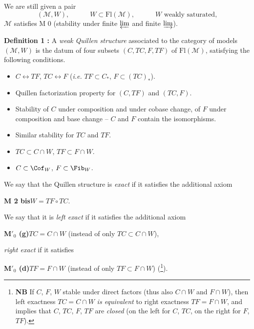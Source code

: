 We are still given a pair
\[
(\mathcal{M}, W), \qquad\quad W \subset \mathrm{Fl}(\mathcal{M}), \qquad\quad W \text{ weakly saturated,}
\]
$\mathcal{M}$ satisfies M 0 (stability under finite $\varprojlim$ and finite $\varinjlim$).

\noindent\textbf{Definition 1 :} A \textit{weak Quillen structure} associated to the category of models $(\mathcal{M}, W)$ is the datum of four subsets $(C, TC, F, TF)$ of $\mathrm{Fl}(\mathcal{M})$, satisfying the following conditions.

\begin{itemize}[leftmargin=3em,labelsep=0.5em,align=left]
\item[\textbf{M 1}] $C \longleftrightarrow TF$, $TC \longleftrightarrow F$ (\textit{i.e.} $TF \subset C_*$, $F \subset (TC)_*$).
\item[\textbf{M 2}] Quillen factorization property for $(C, TF)$ and $(TC, F)$.
\item[\textbf{M 3}] Stability of $C$ under composition and under cobase change, of $F$ under composition and base change -- $C$ and $F$ contain the isomorphisms.
\item[\textbf{M 4}] Similar stability for $TC$ and $TF$.
\item[$\mathbf{M}'$] $TC \subset C \cap W$, $TF \subset F \cap W$.
\item[$\mathbf{M}''$] $C \subset \Cof_W$, $F \subset \Fib_W$.
\end{itemize}

\noindent We say that the Quillen structure is \textit{exact} if it satisfies the additional axiom

\clearpage
{}

\noindent\textbf{M 2 bis}\qquad $W = TF \circ TC$.

\noindent We say that it is \textit{left exact} if it satisfies the additional axiom

\noindent\textbf{M$'_0$ (g)}\qquad $TC = C \cap W$ (instead of only $TC \subset C \cap W$),

\noindent\textit{right exact} if it satisfies

\noindent\textbf{M$'_0$ (d)}\qquad $TF = F \cap W$ (instead of only $TF \subset F \cap W$) (\footnote[20]{\textbf{NB} If $C$, $F$, $W$ stable under direct factors (thus also $C \cap W$ and $F \cap W$), then left exactness $TC = C \cap W$ \textit{is equivalent} to right exactness $TF = F \cap W$, and implies that $C$, $TC$, $F$, $TF$ are \textit{closed} (on the left for $C$, $TC$, on the right for $F$, $TF$).}).

